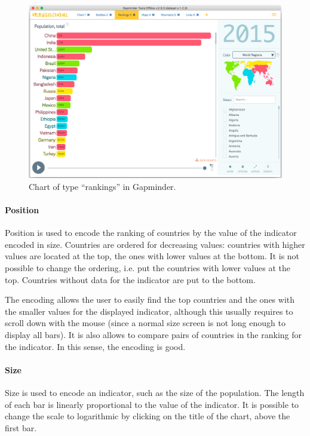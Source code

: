 \begin{figure}[h]
	\centering
	\includegraphics[width=0.95\columnwidth]{figures/rankings}
	\caption{Chart of type ``rankings'' in Gapminder.}
	\label{fig:rankings}
\end{figure}

\paragraph{Position}
Position is used to encode the ranking of countries by the value of the indicator encoded in size.
Countries are ordered for decreasing values:
countries with higher values are located at the top, the ones with lower values at the bottom.
It is not possible to change the ordering, i.e. put the countries with lower values at the top.
Countries without data for the indicator are put to the bottom.

The encoding allows the user to easily find the top countries and the ones with the smaller values for the displayed indicator, although this usually requires to scroll down with the mouse (since a normal size screen is not long enough to display all bars).
It is also allows to compare pairs of countries in the ranking for the indicator.
In this sense, the encoding is good.

\paragraph{Size}
Size is used to encode an indicator, such as the size of the population.
The length of each bar is linearly proportional to the value of the indicator.
It is possible to change the scale to logarithmic by clicking on the title of the chart, above the first bar.

